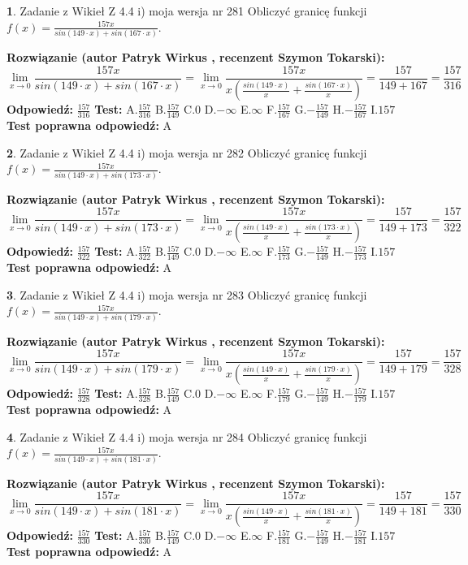\documentclass[12pt, a4paper]{article}
\theoremstyle{definition} %
\newtheorem{zad}{}
\newcommand{\zadStart}[1]{\begin{zad}#1\newline}
\newcommand{\zadStop}{\end{zad}}
\newcommand{\rozwStart}[2]{\noindent \textbf{Rozwiązanie (autor #1 , recenzent #2): }\newline}
\newcommand{\rozwStop}{\newline}
\newcommand{\odpStart}{\noindent \textbf{Odpowiedź:}\newline}
\newcommand{\odpStop}{\newline}
\newcommand{\testStart}{\noindent \textbf{Test:}\newline}
\newcommand{\testStop}{\newline}
\newcommand{\kluczStart}{\noindent \textbf{Test poprawna odpowiedź:}\newline}
\newcommand{\kluczStop}{\newline}
\begin{document}
\zadStart{Zadanie z Wikieł Z 4.4 i) moja wersja nr 281}
Obliczyć granicę funkcji $f(x)=\frac{157x}{sin(149\cdot x) +sin(167\cdot x)}$.
\zadStop
\rozwStart{Patryk Wirkus}{Szymon Tokarski}
$$\lim\limits_{x\to 0}\frac{157x}{sin(149\cdot x) +sin(167\cdot x)}=\lim\limits_{x\to 0}\frac{157x}{x(\frac{sin(149\cdot x)}{x}+\frac{sin(167\cdot x)}{x})}=\frac{157}{149+167} = \frac{157}{316}$$
\rozwStop
\odpStart
$\frac{157}{316}$
\odpStop
\testStart
A.$\frac{157}{316}$
B.$\frac{157}{149}$
C.$0$
D.$-\infty$
E.$\infty$
F.$\frac{157}{167}$
G.$-\frac{157}{149}$
H.$-\frac{157}{167}$
I.$157$
\testStop
\kluczStart
A
\kluczStop



\zadStart{Zadanie z Wikieł Z 4.4 i) moja wersja nr 282}
Obliczyć granicę funkcji $f(x)=\frac{157x}{sin(149\cdot x) +sin(173\cdot x)}$.
\zadStop
\rozwStart{Patryk Wirkus}{Szymon Tokarski}
$$\lim\limits_{x\to 0}\frac{157x}{sin(149\cdot x) +sin(173\cdot x)}=\lim\limits_{x\to 0}\frac{157x}{x(\frac{sin(149\cdot x)}{x}+\frac{sin(173\cdot x)}{x})}=\frac{157}{149+173} = \frac{157}{322}$$
\rozwStop
\odpStart
$\frac{157}{322}$
\odpStop
\testStart
A.$\frac{157}{322}$
B.$\frac{157}{149}$
C.$0$
D.$-\infty$
E.$\infty$
F.$\frac{157}{173}$
G.$-\frac{157}{149}$
H.$-\frac{157}{173}$
I.$157$
\testStop
\kluczStart
A
\kluczStop



\zadStart{Zadanie z Wikieł Z 4.4 i) moja wersja nr 283}
Obliczyć granicę funkcji $f(x)=\frac{157x}{sin(149\cdot x) +sin(179\cdot x)}$.
\zadStop
\rozwStart{Patryk Wirkus}{Szymon Tokarski}
$$\lim\limits_{x\to 0}\frac{157x}{sin(149\cdot x) +sin(179\cdot x)}=\lim\limits_{x\to 0}\frac{157x}{x(\frac{sin(149\cdot x)}{x}+\frac{sin(179\cdot x)}{x})}=\frac{157}{149+179} = \frac{157}{328}$$
\rozwStop
\odpStart
$\frac{157}{328}$
\odpStop
\testStart
A.$\frac{157}{328}$
B.$\frac{157}{149}$
C.$0$
D.$-\infty$
E.$\infty$
F.$\frac{157}{179}$
G.$-\frac{157}{149}$
H.$-\frac{157}{179}$
I.$157$
\testStop
\kluczStart
A
\kluczStop



\zadStart{Zadanie z Wikieł Z 4.4 i) moja wersja nr 284}
Obliczyć granicę funkcji $f(x)=\frac{157x}{sin(149\cdot x) +sin(181\cdot x)}$.
\zadStop
\rozwStart{Patryk Wirkus}{Szymon Tokarski}
$$\lim\limits_{x\to 0}\frac{157x}{sin(149\cdot x) +sin(181\cdot x)}=\lim\limits_{x\to 0}\frac{157x}{x(\frac{sin(149\cdot x)}{x}+\frac{sin(181\cdot x)}{x})}=\frac{157}{149+181} = \frac{157}{330}$$
\rozwStop
\odpStart
$\frac{157}{330}$
\odpStop
\testStart
A.$\frac{157}{330}$
B.$\frac{157}{149}$
C.$0$
D.$-\infty$
E.$\infty$
F.$\frac{157}{181}$
G.$-\frac{157}{149}$
H.$-\frac{157}{181}$
I.$157$
\testStop
\kluczStart
A
\kluczStop
\end{document}
